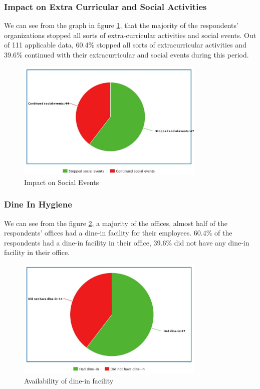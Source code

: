 \documentclass[11pt]{article}
\begin{document}
\subsubsection{Impact on Extra Curricular and Social Activities}
We can see from the graph in figure \ref{social}, that the majority of the respondents’ organizations stopped all sorts of extra-curricular activities and social events. Out of 111 applicable data, 60.4\% stopped all sorts of extracurricular activities and 39.6\% continued with their extracurricular and social events during this period.
\newpage
\begin{figure}[!ht]
	\centering
	\includegraphics[width=0.8\textwidth]{Images/Experience/social events.jpeg}
	\caption{Impact on Social Events}
	\centering
	\label{social}
\end{figure}

\subsubsection{Dine In Hygiene}
We can see from the figure \ref{dine-in}, a majority of the offices, almost half of the respondents’  offices had a dine-in facility for their employees. 60.4\% of the respondents had a dine-in facility in their office, 39.6\% did not have any dine-in facility in their office. 

\begin{figure}[!ht]
	\centering
	\includegraphics[width=0.8\textwidth]{Images/Experience/dine-in.jpeg}
	\caption{Availability of dine-in facility}
	\centering
	\label{dine-in}
\end{figure}
\end{document}
